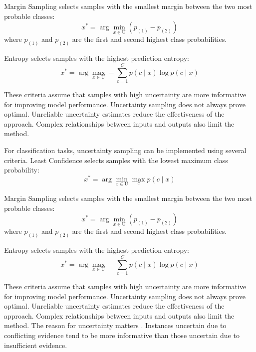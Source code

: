 \documentclass[conference]{IEEEtran}
\newcommand{\set}[1]{\mathrm{#1}}
\begin{document}
Margin Sampling selects samples with the smallest margin between the two most probable classes:
\begin{equation}
x^* = \arg\min_{x \in \set{U}} (p_{(1)} - p_{(2)})
\end{equation}
where $p_{(1)}$ and $p_{(2)}$ are the first and second highest class probabilities.

Entropy selects samples with the highest prediction entropy:
\begin{equation}
x^* = \arg\max_{x \in \set{U}} -\sum_{c=1}^C p(c \mid x) \log p(c \mid x)
\end{equation}

These criteria assume that samples with high uncertainty are more informative for improving model performance. Uncertainty sampling does not always prove optimal. Unreliable uncertainty estimates reduce the effectiveness of the approach. Complex relationships between inputs and outputs also limit the method.

For classification tasks, uncertainty sampling can be implemented using several criteria. Least Confidence selects samples with the lowest maximum class probability:
\begin{equation}
x^* = \arg\min_{x \in \set{U}} \max_c p(c \mid x)
\end{equation}

Margin Sampling selects samples with the smallest margin between the two most probable classes:
\begin{equation}
x^* = \arg\min_{x \in \set{U}} (p_{(1)} - p_{(2)})
\end{equation}
where $p_{(1)}$ and $p_{(2)}$ are the first and second highest class probabilities.

Entropy selects samples with the highest prediction entropy:
\begin{equation}
x^* = \arg\max_{x \in \set{U}} -\sum_{c=1}^C p(c \mid x) \log p(c \mid x)
\end{equation}

These criteria assume that samples with high uncertainty are more informative for improving model performance. Uncertainty sampling does not always prove optimal. Unreliable uncertainty estimates reduce the effectiveness of the approach. Complex relationships between inputs and outputs also limit the method. The reason for uncertainty matters \cite{sharma2016evidence}. Instances uncertain due to conflicting evidence tend to be more informative than those uncertain due to insufficient evidence.
\end{document}
